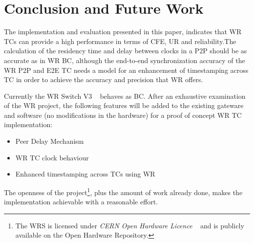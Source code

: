 \section{Conclusion and Future Work}

The implementation and evaluation presented in this paper, indicates that WR TCs
can provide a high performance in terms of CFE, UR and reliability.The calculation of the residency 
time and delay between clocks in a P2P should be as accurate as in WR BC, although the end-to-end 
synchronization accuracy of the WR P2P and E2E TC needs a model for an enhancement of timestamping across TC 
in order to achieve the accuracy and precision that WR offers.

Currently the WR Switch V3 ~\cite{biblio:wrswitch} behaves as BC.
After an exhaustive examination of the WR project, the following features will be
added to the existing gateware and software (no modifications in the hardware)
for a proof of concept WR TC implementation:

\begin{itemize}
    \item Peer Delay Mechanism
    \item WR TC clock behaviour
    \item Enhanced timestamping across TCs using WR
\end{itemize}

The openness of the project\footnote{The WRS is licensed under \textit{CERN Open Hardware Licence}
~\cite{biblio:lic}  and is publicly available on the Open Hardware Repository.},
plus the amount of work already done, makes the implementation achievable with a
reasonable effort.
